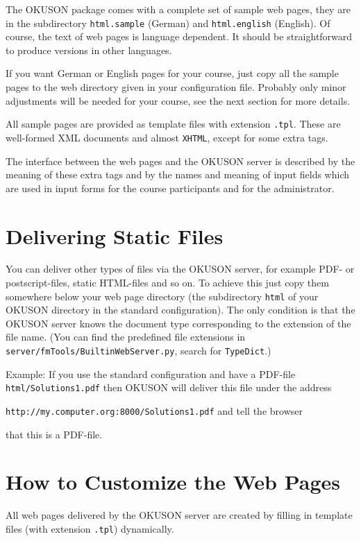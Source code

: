 \documentclass[12pt,openany,a4paper]{book}
\newcommand{\OKUSON}{\textsf{OKUSON}}
\begin{document}
The {\OKUSON} package comes with a complete set of sample web pages, they
are in the subdirectory \verb+html.sample+ (German) and \verb+html.english+
(English). Of course, the text of web pages is language dependent. 
It should be straightforward to produce versions in other languages.

If you want German or English pages for your course,  just copy all the
sample pages to the web directory given in your configuration file. 
Probably  only minor adjustments will be needed for your course, see the
next section for more details.

All sample pages are provided as template files with extension
\texttt{.tpl}. These are well-formed XML documents and almost
\texttt{XHTML}, except for some extra tags.

The interface between the web pages and the {\OKUSON} server is described by
the meaning of these extra tags and by the names and meaning of input 
fields which are used in input forms for the course participants and for
the administrator. 

\section{Delivering Static Files}

You can deliver other types of files via the {\OKUSON} server, for example
PDF- or postscript-files, static HTML-files and so on. To achieve this
just copy them somewhere below your web page directory (the subdirectory 
\texttt{html} of your {\OKUSON} directory in the standard configuration).
The only condition is that the {\OKUSON} server knows the document type 
corresponding to the extension of the file name. (You can find the
predefined file extensions in \texttt{server/fmTools/BuiltinWebServer.py}, 
search for \texttt{TypeDict}.)

Example: If you use the standard configuration and have a 
PDF-file \texttt{html/Solutions1.pdf} then 
{\OKUSON} will deliver this file under the address

\hspace{1cm}  
\texttt{http://my.computer.org:8000/Solutions1.pdf} and tell the browser

that this is a PDF-file. 

\section{How to Customize the Web Pages}

All web pages delivered by the  {\OKUSON} server are created by filling in
template files (with extension \texttt{.tpl}) dynamically.
\end{document}
